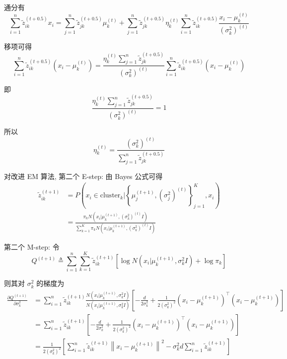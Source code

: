 \documentclass{article}
\begin{document}
通分有
\begin{equation}
  \sum_{i=1}^n\tilde{z}_{ik}^{(t+0.5)}x_i
  =\sum_{j=1}^n\tilde{z}_{jk}^{(t+0.5)}\mu_k^{(t)}+\sum_{j=1}^n\tilde{z}_{jk}^{(t+0.5)}\eta_k^{(t)}\sum_{i=1}^n\tilde{z}_{ik}^{(t+0.5)}\frac{x_i-\mu_k^{(t)}}{(\sigma_k ^2)^{(t)}}
\end{equation}

移项可得
\begin{equation}
  \sum_{i=1}^n\tilde{z}_{ik}^{(t+0.5)}\left(x_i-\mu_k^{(t)}\right)
  =\frac{\eta_k^{(t)}\displaystyle\sum_{j=1}^n\tilde{z}_{jk}^{(t+0.5)}}{(\sigma_k ^2)^{(t)}}\sum_{i=1}^n\tilde{z}_{ik}^{(t+0.5)}\left(x_i-\mu_k^{(t)}\right)
\end{equation}

即
\begin{equation}
  \frac{\eta_k^{(t)}\displaystyle\sum_{j=1}^n\tilde{z}_{jk}^{(t+0.5)}}{(\sigma_k ^2)^{(t)}}=1
\end{equation}

所以
\begin{equation}
  \eta_k^{(t)}=\frac{(\sigma_k ^2)^{(t)}}{\displaystyle\sum_{j=1}^n\tilde{z}_{jk}^{(t+0.5)}}
\end{equation}

对改进 EM 算法, 第二个 E-step: 由 Bayes 公式可得
\begin{equation}
  \begin{aligned}
    \tilde{z}_{ik}^{(t+1)} 
    &=P\left(x_i\in \mathrm{cluster}_k \Big| \left\{\mu_j^{(t+1)},(\sigma_j^2)^{(t)}\right\}_{j=1}^K,x_i\right)\\
    &=\frac{\pi_k N\left(x_i\Big|\mu_k^{(t+1)},(\sigma_k^2)^{(t)}I\right)}{\displaystyle\sum_{k=1}^K\pi_k N\left(x_i\Big|\mu_k^{(t+1)},(\sigma_k^2)^{(t)}I\right)}
  \end{aligned}
\end{equation}

第二个 M-step: 令
\begin{equation}
    Q^{(t+1)}\triangleq\sum_{i=1}^n\sum_{k=1}^K \tilde{z}_{ik}^{(t+1)} \left[\log N\left(x_i\Big|\mu_k^{(t+1)},\sigma_k^2I\right)+\log\pi_k\right]
\end{equation}

则其对 $\sigma_k^2$ 的梯度为
\begin{equation}
  \begin{aligned}
    \frac{\partial Q^{(t+1)}}{\partial \sigma_k^2}
    &=\sum_{i=1}^n\tilde{z}_{ik}^{(t+1)}\frac{N\left(x_i\Big|\mu_k^{(t+1)},\sigma_k^2I\right)}{N\left(x_i\Big|\mu_k^{(t+1)},\sigma_k^2I\right)}\left[-\frac{d}{2\sigma_k^2}+\frac{1}{2(\sigma_k^2)^2}\left(x_i-\mu_k^{(t+1)}\right)^{\top}\left(x_i-\mu_k^{(t+1)}\right)\right]\\
    &=\sum_{i=1}^n\tilde{z}_{ik}^{(t+1)}\left[-\frac{d}{2\sigma_k^2}+\frac{1}{2(\sigma_k^2)^2}\left(x_i-\mu_k^{(t+1)}\right)^{\top}\left(x_i-\mu_k^{(t+1)}\right)\right]\\
    &=\frac{1}{2(\sigma_k^2)^2}\left[\sum_{i=1}^n\tilde{z}_{ik}^{(t+1)}\left\|x_i-\mu_k^{(t+1)}\right\|^2-\sigma_k^2d\sum_{i=1}^n\tilde{z}_{ik}^{(t+1)}\right]
  \end{aligned}
\end{equation}
\end{document}
